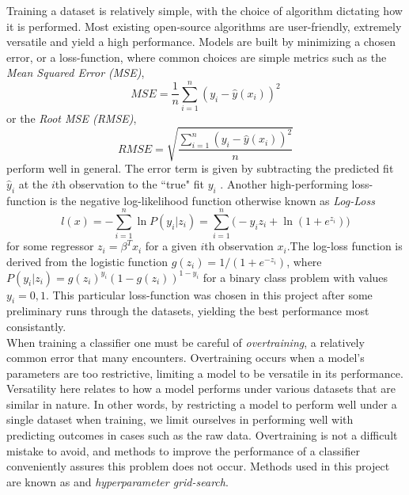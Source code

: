 Training a dataset is relatively simple, with the choice of algorithm dictating how it is performed. Most existing open-source algorithms are user-friendly, extremely versatile and yield a high performance. Models are built by minimizing a chosen error, or a loss-function, where common choices are simple metrics such as the \textit{Mean Squared Error (MSE)}, 
\begin{equation}
    MSE = \frac{1}{n} \sum\limits_{i=1}^{n}(y_i-\hat{y}(x_i))^2
    \label{eq:MSE}
\end{equation}
or the \textit{Root MSE (RMSE)},
\begin{equation}
    RMSE = \sqrt{\frac{\sum\limits_{i=1}^{n}(y_i-\hat{y}(x_i))^2}{n}}
    \label{eq:RMSE}
\end{equation}
perform well in general. The error term is given by subtracting the predicted fit $\hat{y}_i$ at the $i$th observation to the ``true" fit $y_i$ \cite{james2013introduction}. Another high-performing loss-function is the negative log-likelihood function otherwise known as \textit{Log-Loss}
\begin{equation}
    l(x) = -\sum\limits_{i=1}^{n} \ln P(y_i| z_i) = \sum\limits_{i=1}^{n} \Big(-y_i z_i + \ln(1+e^{z_i}) \Big)
    \label{eq:logloss}
\end{equation}
for some regressor $z_i=\beta^T x_i$ for a given $i$th observation $x_i$.The log-loss function is derived from the logistic function $g(z_i)=1/(1+e^{-z_i})$, where $P(y_i| z_i) = g(z_i)^{y_i}(1-g(z_i))^{1-y_i}$ for a binary class problem with values $y_i=0,1$. This particular loss-function was chosen in this project after some preliminary runs through the datasets, yielding the best performance most consistantly. \\

When training a classifier one must be careful of \textit{overtraining}, a relatively common error that many encounters. Overtraining occurs when a model's parameters are too restrictive, limiting a model to be versatile in its performance. Versatility here relates to how a model performs under various datasets that are similar in nature. In other words, by restricting a model to perform well under a single dataset when training, we limit ourselves in performing well with predicting outcomes in cases such as the raw data. Overtraining is not a difficult mistake to avoid, and methods to improve the performance of a classifier conveniently assures this problem does not occur. Methods used in this project are known as  and \textit{hyperparameter grid-search}. \\

